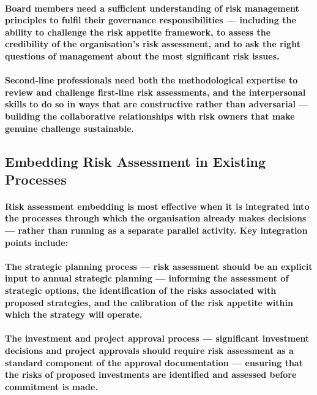 \paragraph{\textbf{Board members} need a sufficient understanding of risk management principles to fulfil their governance responsibilities — including the ability to challenge the risk appetite framework, to assess the credibility of the organisation's risk assessment, and to ask the right questions of management about the most significant risk issues.}
\paragraph{\textbf{Second-line professionals} need both the methodological expertise to review and challenge first-line risk assessments, and the interpersonal skills to do so in ways that are constructive rather than adversarial — building the collaborative relationships with risk owners that make genuine challenge sustainable.}

\subsection{Embedding Risk Assessment in Existing Processes}
\paragraph{Risk assessment embedding is most effective when it is integrated into the processes through which the organisation already makes decisions — rather than running as a separate parallel activity. Key integration points include:}
\paragraph{\textbf{The strategic planning process} — risk assessment should be an explicit input to annual strategic planning — informing the assessment of strategic options, the identification of the risks associated with proposed strategies, and the calibration of the risk appetite within which the strategy will operate.}
\paragraph{\textbf{The investment and project approval process} — significant investment decisions and project approvals should require risk assessment as a standard component of the approval documentation — ensuring that the risks of proposed investments are identified and assessed before commitment is made.}
